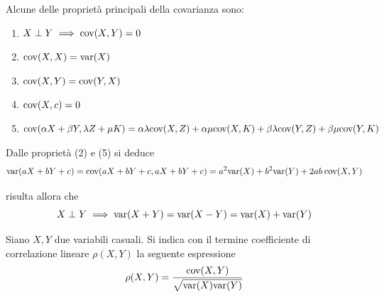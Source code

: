             Alcune delle proprietà principali della covarianza sono:
            \begin{enumerate}
                \item $X \perp Y \implies \textnormal{cov}(X, Y) = 0$
                \item $\textnormal{cov}(X, X) = \textnormal{var}(X)$
                \item $\textnormal{cov}(X, Y) = \textnormal{cov}(Y, X)$
                \item $\textnormal{cov}(X, c) = 0$
                \item $\textnormal{cov}(\alpha X + \beta Y, \lambda Z + \mu K) = \alpha \lambda \textnormal{cov}(X, Z) + \alpha \mu \textnormal{cov}(X, K) + \beta \lambda \textnormal{cov}(Y, Z) + \beta \mu \textnormal{cov}(Y, K)$
            \end{enumerate}

            Dalle proprietà (2) e (5) si deduce
            \[
                \textnormal{var}(aX + bY + c) = \textnormal{cov}(aX + bY + c, aX + bY + c) = a^{2} \textnormal{var}(X) + b^{2} \textnormal{var}(Y) + 2ab \: \textnormal{cov}(X, Y)
            \]

            risulta allora che
            \[
                X \perp Y \implies \textnormal{var}(X + Y) = \textnormal{var}(X - Y) = \textnormal{var}(X) + \textnormal{var}(Y)
            \]

            \begin{definition}
                Siano $X, Y$ due variabili casuali.
                Si indica con il termine coefficiente di correlazione lineare $\rho(X, Y)$ la seguente espressione
                \[
                    \rho(X, Y) = \frac{\textnormal{cov}(X, Y)}{\sqrt{\textnormal{var}(X)\textnormal{var}(Y)}}
                \]
            \end{definition}

